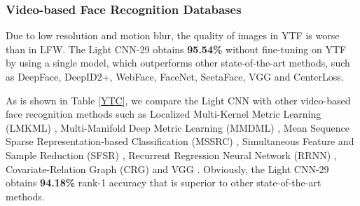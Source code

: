 \documentclass[journal,transmag]{IEEEtran}
\begin{document}
\begin{table*}
\begin{minipage}{0.4\textwidth}
\centering
{}
\end{minipage}
\begin{minipage}{0.45\textwidth}
\centering
{}
\end{minipage}
\end{table*}


\subsubsection{Video-based Face Recognition Databases}
Due to low resolution and motion blur, the quality of images in YTF is worse than in LFW. The Light CNN-29 obtains \textbf{95.54\%} without fine-tuning on YTF by using a single model, which outperforms other state-of-the-art methods, such as DeepFace, DeepID2+, WebFace, FaceNet, SeetaFace, VGG and CenterLoss.

As is shown in Table \ref{YTC}, we compare the Light CNN with other video-based face recognition methods such as Localized Multi-Kernel Metric Learning (LMKML) \cite{DBLP:conf/iccv/LuWM13}, Multi-Manifold Deep Metric Learning (MMDML) \cite{DBLP:conf/cvpr/LuWDMZ15}, Mean Sequence Sparse Representation-based Classification (MSSRC) \cite{DBLP:conf/cvpr/OrtizWS13},  Simultaneous Feature and Sample Reduction (SFSR) \cite{DBLP:conf/aaai/ZhangHCST16},  Recurrent Regression Neural Network (RRNN) \cite{DBLP:journals/corr/LiZC16},  Covariate-Relation Graph (CRG) \cite{DBLP:conf/acpr/ChenJTL15} and VGG \cite{parkhi2015deep}. Obviously, the Light CNN-29 obtains \textbf{94.18\%} rank-1 accuracy that is superior to other state-of-the-art methods.
\end{document}
